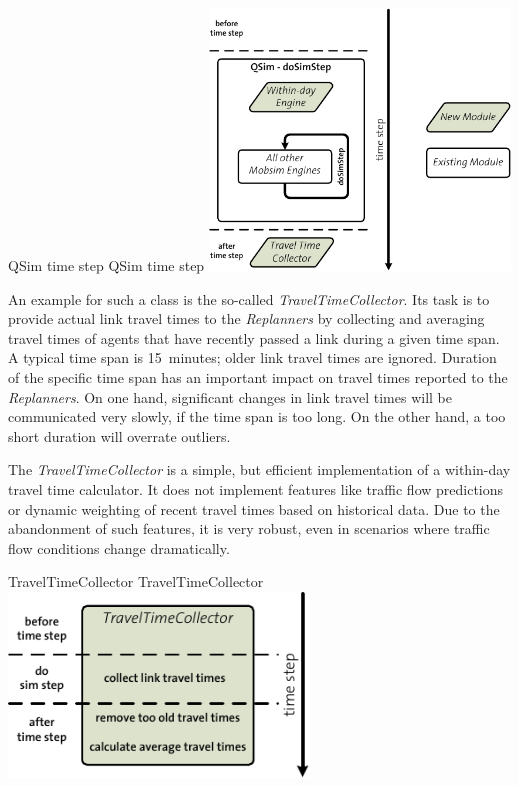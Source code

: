 \createfigure%
{QSim time step}%
{QSim time step}%
{\label{fig:labelQSimTimeStep}}%
{\includegraphics[width=8.0cm, angle=0]{extending/figures/WithinDayReplanning/QSimTimeStep}}%
{}

An example for such a class is the so-called \emph{TravelTimeCollector}. Its task is to provide actual link travel times to the \emph{Replanners} by collecting and averaging travel times of agents that have recently passed a link during a given time span. A typical time span is 15~minutes; older link travel times are ignored. Duration of the specific time span has an important impact on travel times reported to the \emph{Replanners}. On one hand, significant changes in link travel times will be communicated very slowly, if the time span is too long. On the other hand, a too short duration will overrate outliers.

The \emph{TravelTimeCollector} is a simple, but efficient implementation of a within-day travel time calculator. It does not implement features like traffic flow predictions or dynamic weighting of recent travel times based on historical data. Due to the abandonment of such features, it is very robust, even in scenarios where traffic flow conditions change dramatically.

\createfigure%
{TravelTimeCollector}%
{TravelTimeCollector}%
{\label{fig:labelTravelTimeCollector}}%
{\includegraphics[width=8.0cm, angle=0]{extending/figures/WithinDayReplanning/TravelTimeCollector}}%
{}

